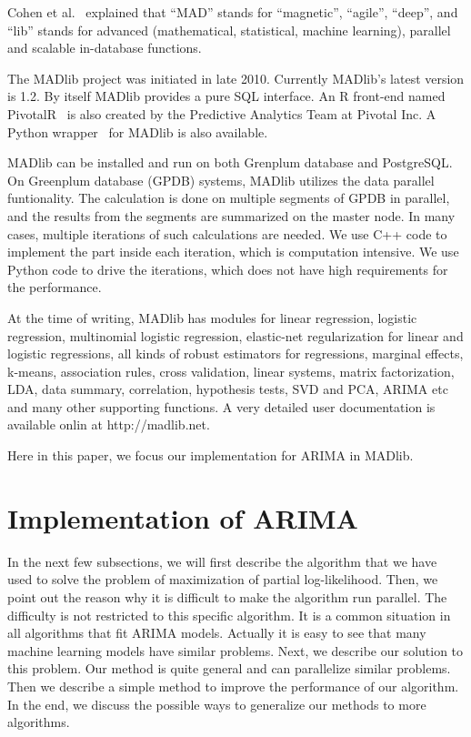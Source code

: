 \documentclass[english,12pt]{article}
\begin{document}
Cohen et al.~\cite{mad-skills} explained that ``MAD'' stands for ``magnetic'',
``agile'', ``deep'', and ``lib'' stands for advanced (mathematical, statistical,
machine learning), parallel and scalable in-database functions.

The MADlib project was initiated in late 2010. Currently MADlib's latest
version is 1.2. By itself MADlib provides a pure SQL interface. An R front-end
named PivotalR~\cite{pivotalr} is also created by the Predictive Analytics Team
at Pivotal Inc. A Python wrapper~\cite{python-madlib} for MADlib is also
available.

MADlib can be installed and run on both Grenplum database and PostgreSQL\@. On
Greenplum database (GPDB) systems, MADlib utilizes the data parallel
funtionality. The calculation is done on multiple segments of GPDB in parallel,
and the results from the segments are summarized on the master node. In many
cases, multiple iterations of such calculations are needed. We use C++ code to
implement the part inside each iteration, which is computation intensive. We
use Python code to drive the iterations, which does not have high requirements
for the performance.



At the time of writing, MADlib has modules for linear regression, logistic
regression, multinomial logistic regression, elastic-net regularization for
linear and logistic regressions, all kinds of robust estimators for
regressions, marginal effects, k-means, association rules, cross validation,
linear systems, matrix factorization, LDA, data summary, correlation,
hypothesis tests, SVD and PCA, ARIMA etc and many other supporting functions.
A very detailed user documentation is available onlin at
http://madlib.net.

Here in this paper, we focus our implementation for ARIMA in MADlib.

\section{Implementation of ARIMA}


In the next few subsections, we will first describe the algorithm that we have
used to solve the problem of maximization of partial log-likelihood. Then, we
point out the reason why it is difficult to make the algorithm run parallel.
The difficulty is not restricted to this specific algorithm. It is a
common situation in all algorithms that fit ARIMA models. Actually it is easy
to see that many machine learning models have similar problems. Next, we
describe our solution to this problem. Our method is quite general and can
parallelize similar problems. Then we describe a simple method to improve the
performance of our algorithm. In the end, we discuss the possible ways to
generalize our methods to more algorithms.
\end{document}
